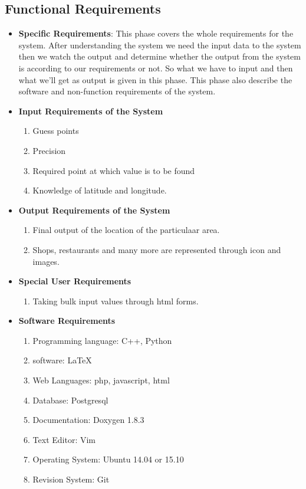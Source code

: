 \subsection{Functional Requirements}
\begin{itemize}
\item {\bf Specific Requirements}: This phase covers the whole requirements 
for the system. After understanding the system we need the input data 
to the system then we watch the output and determine whether the output 
from the system is according to our requirements or not. So what we have 
to input and then what we'll get as output is given in this phase. This 
phase also describe the software and non-function requirements of the 
system.
\item {\bf Input Requirements of the System}
\begin{enumerate} 
\item Guess points
\item Precision
\item Required point at which value is to be found
\item Knowledge of latitude and longitude.
\end{enumerate}
\vskip 0.5cm
\item {\bf Output Requirements of the System}
\begin{enumerate} 
\item Final output of the location of the particulaar area.
\item Shops, restaurants and many more are represented through icon and images.
\end{enumerate}
\vskip 0.5cm
\item {\bf Special User Requirements}
\begin{enumerate} 
\item Taking bulk input values through html forms.
\end{enumerate}
\vskip 0.5cm
\item {\bf Software Requirements}
\begin{enumerate} 
\item Programming language: C++, Python
\item software: \LaTeX{}
\item Web Languages: php, javascript, html
\item Database: Postgresql 
\item Documentation: Doxygen 1.8.3
\item Text Editor: Vim
\item Operating System: Ubuntu 14.04 or 15.10
\item Revision System: Git


\end{enumerate}
\end{itemize}
